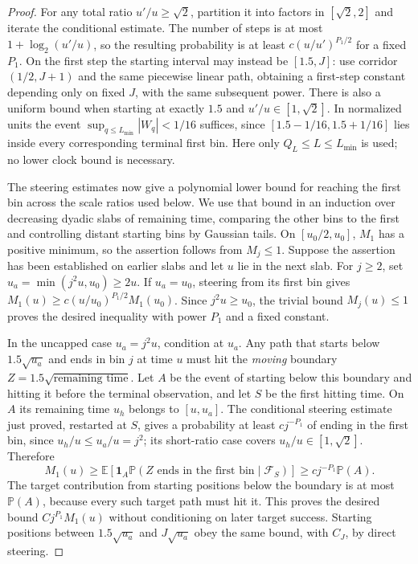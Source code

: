 \documentclass[11pt,a4paper]{article}
\numberwithin{equation}{section}
\theoremstyle{definition}
\theoremstyle{remark}
\newcommand{\E}{\mathbb E}
\newcommand{\Prob}{\mathbb P}
\newcommand{\ind}{\mathbf 1}
\begin{document}
\begin{proof}
For any total ratio $u'/u\ge\sqrt2$, partition it into factors in
$[\sqrt2,2]$ and iterate the conditional estimate. The number of
steps is at most $1+\log_2(u'/u)$, so the resulting probability is
at least $c(u/u')^{P_1/2}$ for a fixed $P_1$. On the first step the
starting interval may instead be $[1.5,J]$: use corridor
$(1/2,J+1)$ and the same piecewise linear path, obtaining a first-step
constant depending only on fixed $J$, with the same subsequent power.
There is also a uniform bound when starting at exactly $1.5$ and
$u'/u\in[1,\sqrt2]$. In normalized units the event
$\sup_{q\le L_{\min}}|W_q|<1/16$ suffices, since
$[1.5-1/16,1.5+1/16]$ lies inside every corresponding terminal first
bin. Here only $Q_L\le L\le L_{\min}$ is used; no lower clock bound
is necessary.

The steering estimates now give a polynomial lower bound for reaching the
first bin across the scale ratios used below.  We use that bound in an
induction over decreasing dyadic slabs of remaining time, comparing the
other bins to the first and controlling distant starting bins by Gaussian
tails.  On $[u_0/2,u_0]$, $M_1$ has a positive minimum, so the assertion follows
from $M_j\le1$. Suppose the assertion has been established on earlier
slabs and let $u$ lie in the next slab. For $j\ge2$, set
$u_a=\min(j^2u,u_0)\ge2u$.
If $u_a=u_0$, steering from its first bin gives
$M_1(u)\ge c(u/u_0)^{P_1/2}M_1(u_0)$. Since $j^2u\ge u_0$,
the trivial bound $M_j(u)\le1$ proves the desired inequality with
power $P_1$ and a fixed constant.

In the uncapped case $u_a=j^2u$, condition at $u_a$. Any path that
starts below $1.5\sqrt{u_a}$ and ends in bin $j$ at time $u$ must
hit the \emph{moving} boundary
$Z=1.5\sqrt{\text{remaining time}}$. Let $A$ be the event of starting below this boundary and hitting it
before the terminal observation, and let $S$ be the first hitting
time. On $A$ its remaining time $u_h$ belongs to $[u,u_a]$.
The conditional steering estimate just proved, restarted at $S$,
gives a probability at least $cj^{-P_1}$ of ending in the first bin,
since $u_h/u\le u_a/u=j^2$; its short-ratio case covers
$u_h/u\in[1,\sqrt2]$. Therefore
\[
 M_1(u)\ge
 \E\!\left[\ind_A\Prob(Z\text{ ends in the first bin}\mid\mathcal F_S)
       \right]\ge cj^{-P_1}\Prob(A).
\]
The target contribution from starting positions below the boundary
is at most $\Prob(A)$, because every such target path must hit it.
This proves the desired bound $Cj^{P_1}M_1(u)$ without conditioning
on later target success.
Starting positions between $1.5\sqrt{u_a}$ and $J\sqrt{u_a}$ obey
the same bound, with $C_J$, by direct steering.


\end{proof}
\end{document}
